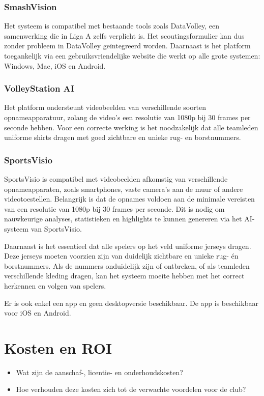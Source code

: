 \subsubsection{SmashVision}
Het systeem is compatibel met bestaande tools zoals DataVolley, een samenwerking die in Liga A zelfs verplicht is. Het scoutingsformulier kan dus zonder probleem in DataVolley geïntegreerd worden. Daarnaast is het platform toegankelijk via een gebruiksvriendelijke website die werkt op alle grote systemen: Windows, Mac, iOS en Android. \autocite{Doren2025}
\subsubsection{VolleyStation AI}
Het platform ondersteunt videobeelden van verschillende soorten opnameapparatuur, zolang de video's een resolutie van 1080p bij 30 frames per seconde hebben. Voor een correcte werking is het noodzakelijk dat alle teamleden uniforme shirts dragen met goed zichtbare en unieke rug- en borstnummers. \autocite{VolleyStationAI2025}
\subsubsection{SportsVisio}
SportsVisio is compatibel met videobeelden afkomstig van verschillende opnameapparaten, zoals smartphones, vaste camera's aan de muur of andere videotoestellen. Belangrijk is dat de opnames voldoen aan de minimale vereisten van een resolutie van 1080p bij 30 frames per seconde. Dit is nodig om nauwkeurige analyses, statistieken en highlights te kunnen genereren via het AI-systeem van SportsVisio.

Daarnaast is het essentieel dat alle spelers op het veld uniforme jerseys dragen. Deze jerseys moeten voorzien zijn van duidelijk zichtbare en unieke rug- én borstnummers. Als de nummers onduidelijk zijn of ontbreken, of als teamleden verschillende kleding dragen, kan het systeem moeite hebben met het correct herkennen en volgen van spelers.\autocite{SportsVisio2025}

Er is ook enkel een app en geen desktopversie beschikbaar. De app is beschikbaar voor iOS en Android. \autocite{Basaranlar2025}

\section{Kosten en ROI}
\begin{itemize}
  \item Wat zijn de aanschaf-, licentie- en onderhoudskosten?
  \item Hoe verhouden deze kosten zich tot de verwachte voordelen voor de club?
\end{itemize}
